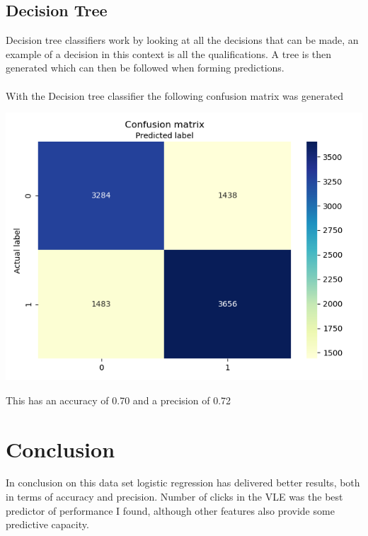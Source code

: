 \documentclass{article}[18pt]
\begin{document}
\subsection{Decision Tree}
Decision tree classifiers work by looking at all the decisions that can be made, an example of a decision in this context is all the qualifications. A tree is then generated which can then be followed when forming predictions.\\
\\
With the Decision tree classifier the following confusion matrix was generated
\begin{center}
	\includegraphics[scale=0.7]{Decision_Tree}
\end{center}
This has an accuracy of 0.70 and a precision of 0.72
\section{Conclusion}
In conclusion on this data set logistic regression has delivered better results, both in terms of accuracy and precision. Number of clicks in the VLE was the best predictor of performance I found, although other features also provide some predictive capacity.
\end{document}
